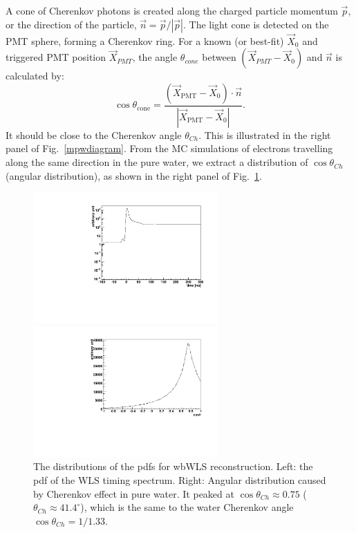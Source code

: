 \documentclass[preprint,12pt]{elsarticle}
\numberwithin{equation}{section}
\begin{document}
A cone of Cherenkov photons is created along the charged particle momentum $\vec{p}$, or the direction of the particle, $\vec n = \vec p/|\vec p|$. The light cone is detected on the PMT sphere, forming a Cherenkov ring. For a known (or best-fit) $\vec{X}_{0}$ and triggered PMT position $\vec{X}_{PMT}$, the angle $\theta_{cone}$ between $(\vec{X}_{PMT}-\vec{X}_{0})$ and $\vec n$ is calculated by:
\[\cos\theta_\mathrm{cone} = \frac{(\vec{X}_\mathrm{PMT}-\vec{X}_{0})\cdot \vec{n}}{|\vec{X}_\mathrm{PMT}-\vec{X}_{0}|}.\]
It should be close to the Cherenkov angle $\theta_{Ch}$. This is illustrated in the right panel of Fig.~\ref{mpwdiagram}. From the MC simulations of electrons travelling along the same direction in the pure water, we extract a distribution of $\cos\theta_{Ch}$ (angular distribution), as shown in the right panel of Fig.~\ref{WLS_pdf}. 

\begin{figure}[htbp]	
	\centering		
		\begin{minipage}[b]{0.5\textwidth}			
			\includegraphics[height=5cm]{WLSTime_pdf.pdf}			
		\end{minipage}%
		\begin{minipage}[b]{0.5\textwidth}		
			\includegraphics[height=5cm]{ChAngle_pdf.pdf}	
		\end{minipage}	
	\caption{\label{WLS_pdf} The distributions of the pdfs for wbWLS reconstruction. Left: the pdf of the WLS timing spectrum. Right: Angular distribution caused by Cherenkov effect in pure water. It peaked at $\cos\theta_{Ch}\approx 0.75$ ($\theta_{Ch}\approx 41.4^\circ$), which is the same to the water Cherenkov angle $\cos\theta_{Ch}=1/1.33$.}	
\end{figure}
\end{document}
